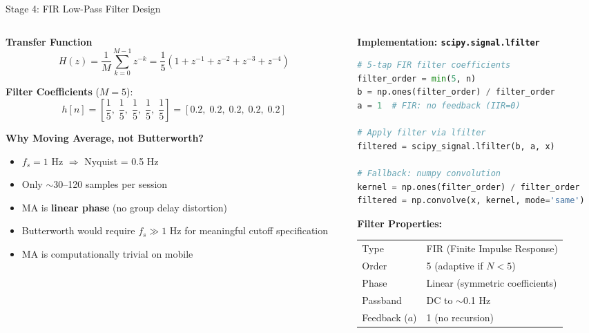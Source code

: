 \documentclass[aspectratio=169,10pt]{beamer}
\begin{document}
\begin{frame}{Stage 4: FIR Low-Pass Filter Design}
\begin{columns}[T]
\begin{column}{0.48\textwidth}
\textbf{Transfer Function}
\begin{equation*}
H(z) = \frac{1}{M}\sum_{k=0}^{M-1} z^{-k} = \frac{1}{5}\left(1 + z^{-1} + z^{-2} + z^{-3} + z^{-4}\right)
\end{equation*}

\vspace{4pt}
\footnotesize
\textbf{Filter Coefficients} ($M = 5$):
\[
h[n] = \left[\frac{1}{5},\; \frac{1}{5},\; \frac{1}{5},\; \frac{1}{5},\; \frac{1}{5}\right] = [0.2,\; 0.2,\; 0.2,\; 0.2,\; 0.2]
\]

\vspace{6pt}
\textbf{Why Moving Average, not Butterworth?}
\begin{itemize}\scriptsize
  \item $f_s = 1$ Hz $\Rightarrow$ Nyquist = 0.5 Hz
  \item Only $\sim$30--120 samples per session
  \item MA is \textbf{linear phase} (no group delay distortion)
  \item Butterworth would require $f_s \gg 1$ Hz for meaningful cutoff specification
  \item MA is computationally trivial on mobile
\end{itemize}
\end{column}

\begin{column}{0.48\textwidth}
\textbf{Implementation: \texttt{scipy.signal.lfilter}}
\begin{lstlisting}[language=Python]
# 5-tap FIR filter coefficients
filter_order = min(5, n)
b = np.ones(filter_order) / filter_order
a = 1  # FIR: no feedback (IIR=0)

# Apply filter via lfilter
filtered = scipy_signal.lfilter(b, a, x)

# Fallback: numpy convolution
kernel = np.ones(filter_order) / filter_order
filtered = np.convolve(x, kernel, mode='same')
\end{lstlisting}

\vspace{4pt}
\footnotesize
\textbf{Filter Properties:}
\begin{tabular}{@{}ll@{}}
\toprule
Type & FIR (Finite Impulse Response) \\
Order & 5 (adaptive if $N < 5$) \\
Phase & Linear (symmetric coefficients) \\
Passband & DC to $\sim$0.1 Hz \\
Feedback ($a$) & 1 (no recursion) \\
\bottomrule
\end{tabular}
\end{column}
\end{columns}
\end{frame}
\end{document}
